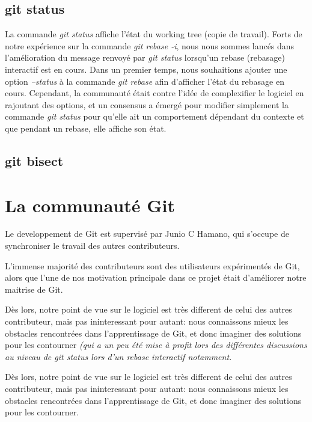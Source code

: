 \documentclass[a4paper, 12pt]{article}
\newcommand{\textremil}[1]{\emph{\color{red} #1}}
\newcommand{\gitcmd}[1]{\emph{#1}}
\newcommand{\tech}[1]{\emph{#1}}
\begin{document}
\subsection{git status}

La commande \gitcmd{git status} affiche l'état du working tree (copie de travail).
Forts de notre expérience sur la commande \gitcmd{git rebase -i}, nous nous sommes lancés dans l'amélioration du message renvoyé par \gitcmd{git status} lorsqu'un rebase (rebasage) interactif est en cours.
Dans un premier temps, nous souhaitions ajouter une option \textit{--status} à la commande \gitcmd{git rebase} afin d'afficher l'état du rebasage en cours. 
Cependant, la communauté était contre l'idée de complexifier le logiciel en rajoutant des options, et un consensus a émergé pour modifier simplement la commande \gitcmd{git status} pour qu'elle ait un comportement dépendant du contexte et que pendant un rebase, elle affiche son état.

\subsection{git bisect}



\section{La communauté Git}

Le developpement de Git est supervisé par Junio C Hamano, qui s'occupe de synchroniser le travail des autres contributeurs.

L'immense majorité des contributeurs sont des utilisateurs expérimentés de Git, alors que l'une de nos motivation principale dans ce projet était d'améliorer notre maitrise de Git.

Dès lors, notre point de vue sur le logiciel est très different de celui des autres contributeur, mais pas ininteressant pour autant: nous connaissons mieux les obstacles rencontrées dans l'apprentissage de Git, et donc imaginer des solutions pour les contourner
\textremil{(qui a un peu été mise à profit lors des différentes discussions au niveau de \gitcmd{git status} lors d'un \tech{rebase interactif} notamment.}

Dès lors, notre point de vue sur le logiciel est très different de celui des autres contributeur, mais pas ininteressant pour autant: nous connaissons mieux les obstacles rencontrées dans l'apprentissage de Git, et donc imaginer des solutions pour les contourner.
~\\
\end{document}
